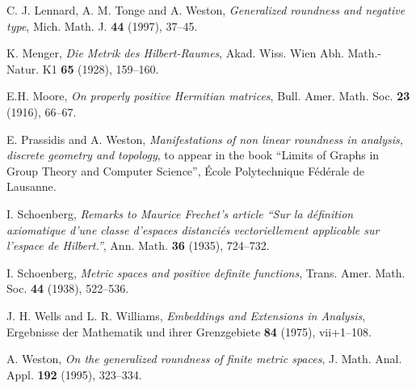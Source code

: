 \documentclass[10pt]{amsart}
\theoremstyle{definition}
\theoremstyle{remark}
\begin{document}
\begin{thebibliography}{BMWZ}
 C. J. Lennard, A. M. Tonge and A. Weston, \textit{Generalized roundness and negative type},
Mich. Math. J. \textbf{44} (1997), 37--45.

 K. Menger, \textit{Die Metrik des Hilbert-Raumes}, Akad. Wiss. Wien Abh. Math.-Natur. K1
\textbf{65} (1928), 159--160.

 E.H. Moore, \textit{On properly positive Hermitian matrices},
Bull. Amer. Math. Soc. \textbf{23} (1916), 66--67.

 E. Prassidis and A. Weston, \textit{Manifestations of non linear roundness in
         analysis, discrete geometry and topology}, to appear in the book ``Limits of Graphs in Group Theory
         and Computer Science'', \'Ecole Polytechnique F\'ed\'erale de Lausanne.

 I. Schoenberg, \textit{Remarks to Maurice Frechet's article ``Sur la d\'{e}finition axiomatique
d'une classe d'espaces distanci\'{e}s vectoriellement applicable sur l'espace de Hilbert.''}, Ann. Math. \textbf{36}
(1935), 724--732.

 I. Schoenberg, \textit{Metric spaces and positive definite functions}, Trans. Amer. Math. Soc.
\textbf{44} (1938), 522--536.

 J. H. Wells and L. R. Williams, \textsl{Embeddings and Extensions in Analysis}, Ergebnisse
der Mathematik und ihrer Grenzgebiete \textbf{84} (1975), vii+1--108.

 A. Weston, \textit{On the generalized roundness of finite metric spaces}, J. Math. Anal. Appl.
\textbf{192} (1995), 323--334.
\end{thebibliography}
\end{document}
